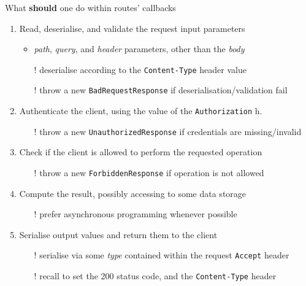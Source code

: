 \documentclass[presentation]{beamer}\mode<presentation>{\usetheme{AMSBolognaFC}}
\begin{document}
\begin{frame}[allowframebreaks]
    \begin{block}{What \textbf{should} one do within routes' callbacks}
        \begin{enumerate}
            \item Read, deserialise, and validate the request \alert{input} parameters
            \begin{itemize}
                \item \emph{path}, \emph{query}, and \emph{header} parameters, other than the \emph{body}
                \item[!] deserialise according to the \texttt{Content-Type} header value
                \item[!] throw a new \texttt{BadRequestResponse} if deserialisation/validation fail
            \end{itemize}

            \item \alert{Authenticate} the client, using the value of the \texttt{Authorization} h.
            \begin{itemize}
                \item[!] throw a new \texttt{UnauthorizedResponse} if credentials are missing/invalid
            \end{itemize}

            \item Check if the client \alert{is allowed} to perform the requested operation
            \begin{itemize}
                \item[!] throw a new \texttt{ForbiddenResponse} if operation is not allowed
            \end{itemize}

            \item Compute the result, possibly accessing to some data storage
            \begin{itemize}
                \item[!] prefer asynchronous programming whenever possible
            \end{itemize}

            \item \alert{Serialise} output values and return them to the client
            \begin{itemize}
                \item[!] serialise via some \emph{type} contained within the request \texttt{Accept} header
                \item[!] recall to set the 200 status code, and the \texttt{Content-Type} header
            \end{itemize}
        \end{enumerate}
    \end{block}


\end{frame}
\end{document}
